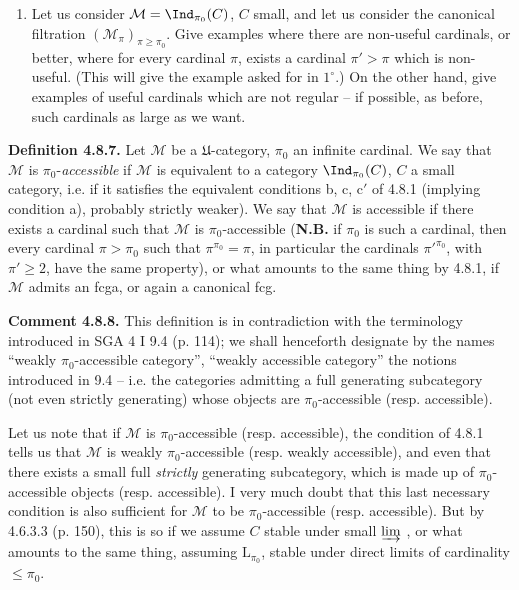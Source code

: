 \begin{enumerate}
\item[4)] Let us consider $\mathcal{M}=\Ind_{\pi_0}(C)$, $C$ small, and let us consider the canonical filtration $(\mathcal{M}_\pi)_{\pi\geqslant\pi_0}$. Give examples where there are non-useful cardinals, or better, where for every cardinal $\pi$, exists a cardinal $\pi'>\pi$ which is non-useful. (This will give the example asked for in $1^\circ$.) On the other hand, give examples of useful cardinals which are not regular -- if possible, as before, such cardinals as large as we want.
\end{enumerate}

\textbf{Definition 4.8.7.} Let $\mathcal{M}$ be a $\mathfrak{U}$-category, $\pi_0$ an infinite cardinal. We say that $\mathcal{M}$ is $\pi_0$-\textit{accessible} if $\mathcal{M}$ is equivalent to a category $\Ind_{\pi_0}(C)$, $C$ a small category, i.e. if it satisfies the equivalent conditions b, c, c$'$ of 4.8.1 (implying condition a), probably strictly weaker). We say that $\mathcal{M}$ is accessible if there exists a cardinal such that $\mathcal{M}$ is $\pi_0$-accessible (\textbf{N.B.} if $\pi_0$ is such a cardinal, then every cardinal $\pi>\pi_0$ such that $\pi^{\pi_0}=\pi$, in particular the cardinals $\pi'^{\pi_0}$, with $\pi'\geqslant 2$, have the same property), or what
amounts to the same thing by 4.8.1, if $\mathcal{M}$ admits an fcga, or again a canonical fcg.

\textbf{Comment 4.8.8.} This definition is in contradiction with the terminology introduced in SGA 4 I 9.4 (p. 114); we shall henceforth designate by the names ``weakly $\pi_0$-accessible category'', ``weakly accessible category'' the notions introduced in 9.4 -- i.e. the categories admitting a full generating subcategory (not even strictly generating) whose objects are $\pi_0$-accessible (resp. accessible).

Let us note that if $\mathcal{M}$ is $\pi_0$-accessible (resp. accessible), the condition of 4.8.1 tells us that $\mathcal{M}$ is weakly $\pi_0$-accessible (resp. weakly accessible), and even that there exists a small full \textit{strictly} generating subcategory, which is made up of $\pi_0$-accessible objects (resp. accessible). I very much doubt that this last necessary condition is also sufficient for
$\mathcal{M}$ to be $\pi_0$-accessible (resp. accessible). But by 4.6.3.3 (p. 150), this is so if we assume $C$ stable under small $\varinjlim$ , or what amounts to the same thing, assuming $\mathrm{L}_{\pi_0}$, stable under direct limits of cardinality $\leqslant\pi_0$.

